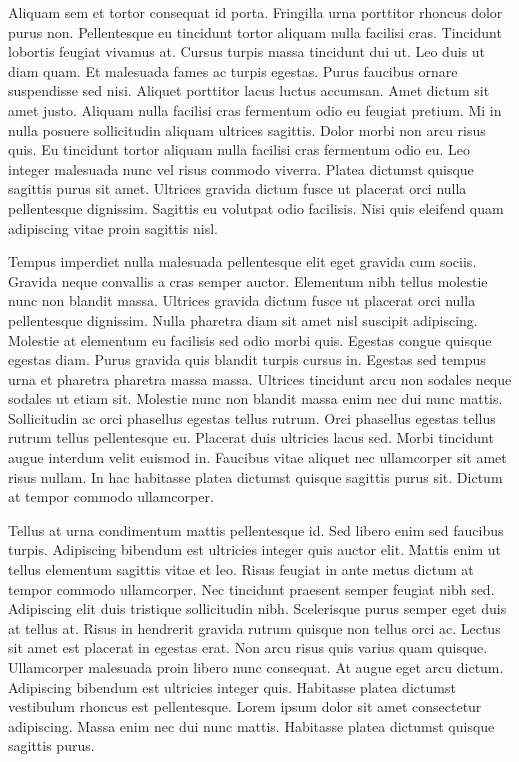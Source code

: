 \documentclass[conference]{IEEEtran}
\begin{document}
Aliquam sem et tortor consequat id porta. Fringilla urna porttitor rhoncus dolor purus non. Pellentesque eu tincidunt tortor aliquam nulla facilisi cras. Tincidunt lobortis feugiat vivamus at. Cursus turpis massa tincidunt dui ut. Leo duis ut diam quam. Et malesuada fames ac turpis egestas. Purus faucibus ornare suspendisse sed nisi. Aliquet porttitor lacus luctus accumsan. Amet dictum sit amet justo. Aliquam nulla facilisi cras fermentum odio eu feugiat pretium. Mi in nulla posuere sollicitudin aliquam ultrices sagittis. Dolor morbi non arcu risus quis. Eu tincidunt tortor aliquam nulla facilisi cras fermentum odio eu. Leo integer malesuada nunc vel risus commodo viverra. Platea dictumst quisque sagittis purus sit amet. Ultrices gravida dictum fusce ut placerat orci nulla pellentesque dignissim. Sagittis eu volutpat odio facilisis. Nisi quis eleifend quam adipiscing vitae proin sagittis nisl.

Tempus imperdiet nulla malesuada pellentesque elit eget gravida cum sociis. Gravida neque convallis a cras semper auctor. Elementum nibh tellus molestie nunc non blandit massa. Ultrices gravida dictum fusce ut placerat orci nulla pellentesque dignissim. Nulla pharetra diam sit amet nisl suscipit adipiscing. Molestie at elementum eu facilisis sed odio morbi quis. Egestas congue quisque egestas diam. Purus gravida quis blandit turpis cursus in. Egestas sed tempus urna et pharetra pharetra massa massa. Ultrices tincidunt arcu non sodales neque sodales ut etiam sit. Molestie nunc non blandit massa enim nec dui nunc mattis. Sollicitudin ac orci phasellus egestas tellus rutrum. Orci phasellus egestas tellus rutrum tellus pellentesque eu. Placerat duis ultricies lacus sed. Morbi tincidunt augue interdum velit euismod in. Faucibus vitae aliquet nec ullamcorper sit amet risus nullam. In hac habitasse platea dictumst quisque sagittis purus sit. Dictum at tempor commodo ullamcorper.

Tellus at urna condimentum mattis pellentesque id. Sed libero enim sed faucibus turpis. Adipiscing bibendum est ultricies integer quis auctor elit. Mattis enim ut tellus elementum sagittis vitae et leo. Risus feugiat in ante metus dictum at tempor commodo ullamcorper. Nec tincidunt praesent semper feugiat nibh sed. Adipiscing elit duis tristique sollicitudin nibh. Scelerisque purus semper eget duis at tellus at. Risus in hendrerit gravida rutrum quisque non tellus orci ac. Lectus sit amet est placerat in egestas erat. Non arcu risus quis varius quam quisque. Ullamcorper malesuada proin libero nunc consequat. At augue eget arcu dictum. Adipiscing bibendum est ultricies integer quis. Habitasse platea dictumst vestibulum rhoncus est pellentesque. Lorem ipsum dolor sit amet consectetur adipiscing. Massa enim nec dui nunc mattis. Habitasse platea dictumst quisque sagittis purus.
\end{document}
